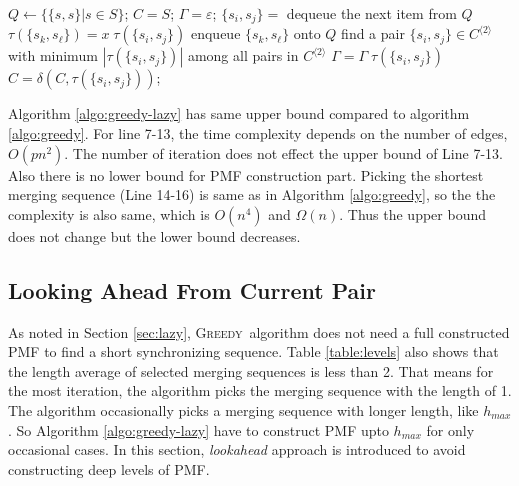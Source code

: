 \documentclass[12pt]{article}
\newcommand{\greedyAlgo}{\textsc{Greedy}}
\begin{document}
\begin{algorithm}[ht]	
	\caption{\greedyAlgo\ algorithm with lazy PMF construction}
	\label{algo:greedy-lazy}
	
	$Q \longleftarrow \{ \{ s,s \}| s \in S \}$; 
	$C = S$; 
	$\Gamma = \varepsilon$; 
	{
		{
			$\{ s_i, s_j \} = $ dequeue the next item from $Q$\;
			{
				{
					{
						$\tau(\{ s_k, s_\ell \}) = x \; \tau(\{ s_i, s_j\})$\;
						enqueue $\{ s_k,s_\ell \}$ onto $Q$\;
					}
				}
			} 		
		}
		find a pair $\{ s_i, s_j \} \in C^{\langle 2 \rangle}$ 
		with minimum $|\tau(\{ s_i,s_j \})|$ among all pairs 
		in $C^{\langle 2 \rangle}$\;
		$\Gamma = \Gamma \; \tau(\{ s_i, s_j \})$\;
		$C = \delta(C,\tau(\{ s_i,s_j\}))$;
	}
\end{algorithm}

Algorithm \ref{algo:greedy-lazy} has same upper bound compared to algorithm \ref{algo:greedy}. For line 7-13, the time complexity depends on the number of edges, $O(pn^2)$. The number of iteration does not effect the upper bound of Line 7-13. Also there is no lower bound for PMF construction part. Picking the shortest merging sequence (Line 14-16) is same as in Algorithm \ref{algo:greedy}, so the the complexity is also same, which is $O(n^4)$ and $\Omega(n)$. Thus the upper bound does not change but the lower bound decreases.

\subsection{Looking Ahead From Current Pair}
\label{sec:lookahead}

As noted in Section \ref{sec:lazy}, \greedyAlgo\ algorithm does not need a full constructed PMF to find a short synchronizing sequence. Table \ref{table:levels} also shows that the length average of selected merging sequences is less than 2. That means for the most iteration, the algorithm picks the merging sequence with the length of 1. The algorithm occasionally picks a merging sequence with longer length, like $h_{max}$. So Algorithm \ref{algo:greedy-lazy} have to construct PMF upto $h_{max}$ for only occasional cases. In this section, \textit{lookahead} approach is introduced to avoid constructing deep levels of PMF. 
\end{document}
